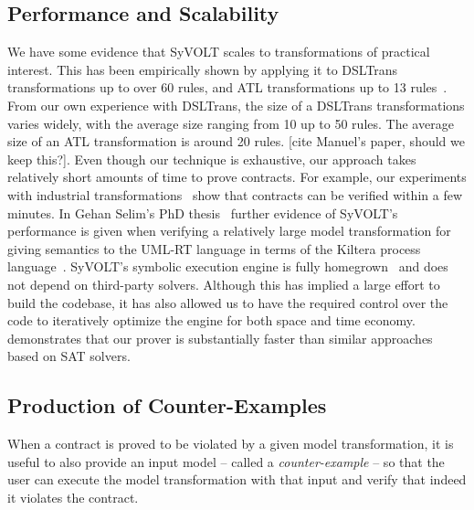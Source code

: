 \subsection{Performance and Scalability}

We have some evidence that SyVOLT scales to transformations of practical
interest. This has been empirically shown by applying it to DSLTrans
transformations up to over 60 rules, and ATL transformations up to 13
rules~\cite{Oakes}. From our own experience with DSLTrans, the size of a
DSLTrans transformations varies widely, with the average size ranging from 10 up
to 50 rules. The average size of an ATL transformation is around 20 rules. [cite
Manuel's paper, should we keep this?]. Even though our technique is exhaustive, our
approach takes relatively short amounts of time to prove contracts. For example,
our experiments with industrial transformations~\cite{Oakes} show that contracts
can be verified within a few minutes. In Gehan Selim's PhD
thesis~\cite{Selim2015} further evidence of SyVOLT's performance is given when
verifying a relatively large model transformation for giving semantics to the
UML-RT language in terms of the Kiltera process language~\cite{PosseDingel2014}.
SyVOLT's symbolic execution engine is fully
homegrown~\cite{LucioVang} and does not depend on third-party solvers. Although this has implied
a large effort to build the codebase, it has also allowed us to have the
required control over the code to iteratively optimize the engine for both space
and time economy.
\cite{Selim2014} demonstrates that our prover is substantially faster than
similar approaches based on SAT solvers.


\subsection{Production of Counter-Examples}

When a contract is proved to be violated by a given model transformation, it is
useful to also provide an input model -- called a \emph{counter-example} -- so
that the user can execute the model transformation with that input and verify
that indeed it violates the contract.

